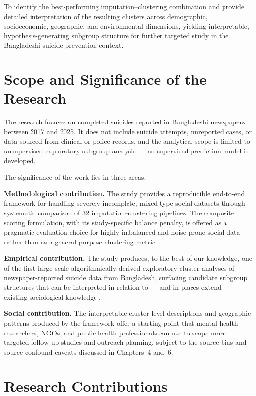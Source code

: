 To identify the best-performing imputation--clustering combination and provide detailed interpretation of the resulting clusters across demographic, socioeconomic, geographic, and environmental dimensions, yielding interpretable, hypothesis-generating subgroup structure for further targeted study in the Bangladeshi suicide-prevention context.

\section{Scope and Significance of the Research}

The research focuses on completed suicides reported in Bangladeshi newspapers between 2017 and 2025. It does not include suicide attempts, unreported cases, or data sourced from clinical or police records, and the analytical scope is limited to unsupervised exploratory subgroup analysis --- no supervised prediction model is developed.

The significance of the work lies in three areas.

\textbf{Methodological contribution.} The study provides a reproducible end-to-end framework for handling severely incomplete, mixed-type social datasets through systematic comparison of 32 imputation--clustering pipelines. The composite scoring formulation, with its study-specific balance penalty, is offered as a pragmatic evaluation choice for highly imbalanced and noise-prone social data rather than as a general-purpose clustering metric.

\textbf{Empirical contribution.} The study produces, to the best of our knowledge, one of the first large-scale algorithmically derived exploratory cluster analyses of newspaper-reported suicide data from Bangladesh, surfacing candidate subgroup structures that can be interpreted in relation to --- and in places extend --- existing sociological knowledge \cite{ref51,ref30}.

\textbf{Social contribution.} The interpretable cluster-level descriptions and geographic patterns produced by the framework offer a starting point that mental-health researchers, NGOs, and public-health professionals can use to scope more targeted follow-up studies and outreach planning, subject to the source-bias and source-confound caveats discussed in Chapters~4 and~6.

\section{Research Contributions}


